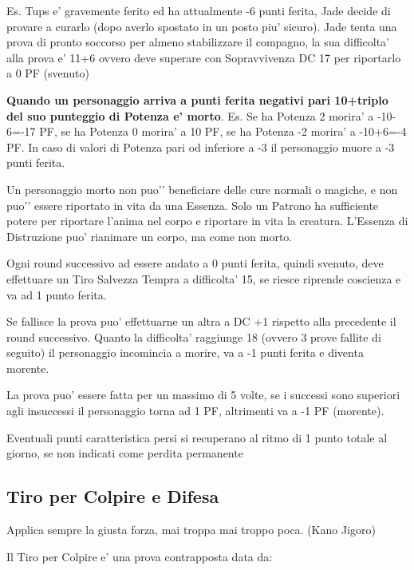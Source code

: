 \documentclass[a4paper,11pt,twoside,openany]{dndbook}
\begin{document}
Es. Tups e’ gravemente ferito ed ha attualmente -6 punti ferita, Jade decide di provare a curarlo (dopo averlo spostato in un posto piu’ sicuro). Jade tenta una prova di pronto soccorso per almeno stabilizzare il compagno, la sua difficolta’ alla prova e’ 11+6 ovvero deve superare con Sopravvivenza DC 17 per riportarlo a 0 PF (svenuto)

\textbf{Quando un personaggio arriva a punti ferita negativi pari 10+triplo del suo punteggio di Potenza e’ morto}. Es. Se ha Potenza 2 morira’ a -10-6=-17 PF, se ha Potenza 0 morira’ a 10 PF, se ha Potenza -2 morira’ a -10+6=-4 PF. In caso di valori di Potenza pari od inferiore a -3 il personaggio muore a -3 punti ferita.

\bigskip

Un personaggio morto non puo'’ beneficiare delle cure normali o magiche, e non puo'’ essere riportato in vita da una Essenza. Solo un Patrono ha sufficiente potere per riportare l’anima nel corpo e riportare in vita la creatura. L’Essenza di Distruzione puo' rianimare un corpo, ma come non morto.

Ogni round successivo ad essere andato a 0 punti ferita, quindi svenuto, deve effettuare un Tiro Salvezza Tempra a difficolta’ 15, se riesce riprende coscienza e va ad 1 punto ferita.

Se fallisce la prova puo’ effettuarne un altra a DC +1 rispetto alla precedente il round successivo. Quanto la difficolta’ raggiunge 18 (ovvero 3 prove fallite di seguito) il personaggio incomincia a morire, va a -1 punti ferita e diventa morente.

La prova puo’ essere fatta per un massimo di 5 volte, se i successi sono superiori agli insuccessi il personaggio torna ad 1 PF, altrimenti va a -1 PF (morente).

Eventuali punti caratteristica persi si recuperano al ritmo di 1 punto totale al giorno, se non indicati come perdita permanente
\pagebreak

\subsection{Tiro per Colpire e Difesa}

\label{tiro-per-colpire}
\begin{quotebox}Applica sempre la giusta forza, mai troppa mai troppo poca. (Kano Jigoro)
\end{quotebox}

Il Tiro per Colpire e' una prova contrapposta data da:
\end{document}
